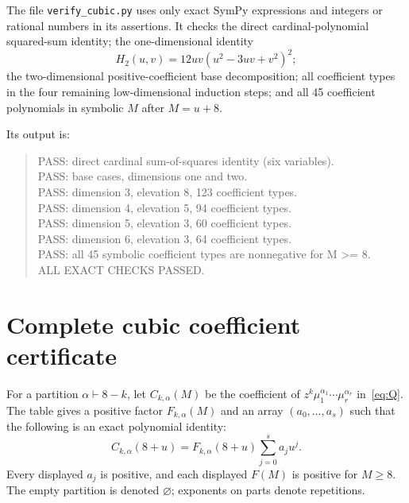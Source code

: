 \documentclass[11pt,a4paper]{article}
\theoremstyle{remark}
\begin{document}
The file \texttt{verify\_cubic.py} uses only exact SymPy expressions and integers or rational numbers in its assertions. It checks the direct cardinal-polynomial squared-sum identity; the one-dimensional identity
\[
 H_2(u,v)=12uv(u^2-3uv+v^2)^2;
\]
the two-dimensional positive-coefficient base decomposition; all coefficient types in the four remaining low-dimensional induction steps; and all 45 coefficient polynomials in symbolic $M$ after $M=u+8$.

Its output is:
\begin{quote}\ttfamily\small
PASS: direct cardinal sum-of-squares identity (six variables).\\
PASS: base cases, dimensions one and two.\\
PASS: dimension 3, elevation 8, 123 coefficient types.\\
PASS: dimension 4, elevation 5, 94 coefficient types.\\
PASS: dimension 5, elevation 3, 60 coefficient types.\\
PASS: dimension 6, elevation 3, 64 coefficient types.\\
PASS: all 45 symbolic coefficient types are nonnegative for M >= 8.\\
ALL EXACT CHECKS PASSED.
\end{quote}

\newpage
\appendix
\section{Complete cubic coefficient certificate}\label{app:certificate}

For a partition $\alpha\vdash8-k$, let $C_{k,\alpha}(M)$ be the coefficient of $z^k\mu_1^{\alpha_1}\cdots\mu_r^{\alpha_r}$ in~\eqref{eq:Q}. The table gives a positive factor $F_{k,\alpha}(M)$ and an array $(a_0,\ldots,a_s)$ such that the following is an exact polynomial identity:
\begin{equation}\label{eq:tablemeaning}
 C_{k,\alpha}(8+u)=F_{k,\alpha}(8+u)\sum_{j=0}^s a_j u^j.
\end{equation}
Every displayed $a_j$ is positive, and each displayed $F(M)$ is positive for $M\ge8$. The empty partition is denoted $\varnothing$; exponents on parts denote repetitions.
\end{document}
